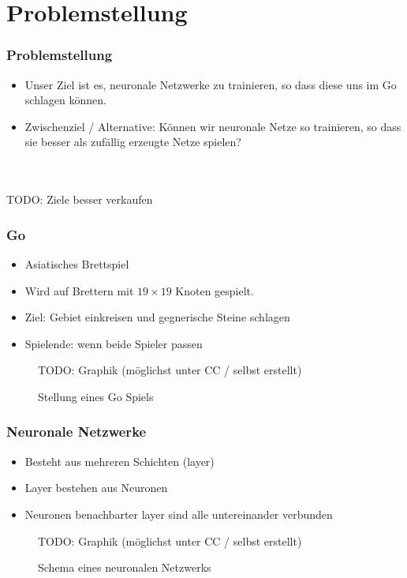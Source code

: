 \section{Problemstellung}

\begin{frame}
    \frametitle{Problemstellung}
    \begin{itemize}
        \item
            Unser Ziel ist es, neuronale Netzwerke zu trainieren, so dass diese
            uns im Go schlagen können.

        \item Zwischenziel / Alternative:
            Können wir neuronale Netze so trainieren, so dass sie besser als
            zufällig erzeugte Netze spielen?
    \end{itemize}

    \hfill \\
    \hfill \\
    TODO: Ziele besser verkaufen
\end{frame}

\begin{frame}
    \frametitle{Go}
    \begin{itemize}
        \item Asiatisches Brettspiel
        \item Wird auf Brettern mit $19 \times 19$ Knoten gespielt.
        \item Ziel: Gebiet einkreisen und gegnerische Steine schlagen
        \item Spielende: wenn beide Spieler passen
    \end{itemize}
    \begin{figure}
        TODO: Graphik (möglichst unter CC / selbst erstellt)
        \caption{Stellung eines Go Spiels}
    \end{figure}
\end{frame}

\begin{frame}
    \frametitle{Neuronale Netzwerke}
    \begin{itemize}
        \item Besteht aus mehreren Schichten (layer)
        \item Layer bestehen aus Neuronen
        \item Neuronen benachbarter layer sind alle untereinander verbunden
    \end{itemize}
    \begin{figure}
        TODO: Graphik (möglichst unter CC / selbst erstellt)
        \caption{Schema eines neuronalen Netzwerks}
    \end{figure}
\end{frame}
